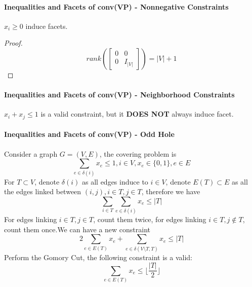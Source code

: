                \paragraph{Inequalities and Facets of conv(VP) - Nonnegative Constraints}
                    $x_i \ge 0$ induce facets.\\
                    \begin{proof}
                        \begin{equation*}
                            rank\left(\left[\begin{matrix}0 & 0 \\ 0 & I_{|V|}\end{matrix}\right]\right) = |V| + 1 \nonumber
                        \end{equation*}    
                    \end{proof}               

                \paragraph{Inequalities and Facets of conv(VP) - Neighborhood Constraints}
                    $x_i + x_j \le 1$ is a valid constraint, but it \textbf{DOES NOT} always induce facet.

                \paragraph{Inequalities and Facets of conv(VP) - Odd Hole}
                    Consider a graph $G=(V, E)$, the covering problem is
                    \begin{equation*}
                        \sum_{e\in \delta(i)}x_e \le 1, i\in V, x_e\in \{0, 1\}, e\in E\nonumber
                    \end{equation*}
                    For $T\subset V$, denote $\delta(i)$ as all edges induce to $i\in V$, denote $E(T) \subset E$ as all the edges linked between $(i, j), i\in T, j\in T$, therefore we have
                    \begin{equation*}
                        \sum_{i\in T}\sum_{e\in \delta(i)}x_e \le |T| \nonumber
                    \end{equation*}
                    For edges linking $i \in T, j \in T$, count them twice, for edges linking $i\in T, j\notin T$, count them once.We can have a new constraint
                    \begin{equation*}
                        2\sum_{e\in E(T)}x_e + \sum_{e\in \delta(V\setminus T, T)}x_e \le |T| \nonumber
                    \end{equation*}
                    Perform the Gomory Cut, the following constraint is a valid:
                    \begin{equation*}
                        \sum_{e\in E(T)}x_e \le \lfloor \frac{|T|}2 \rfloor \nonumber
                    \end{equation*}

